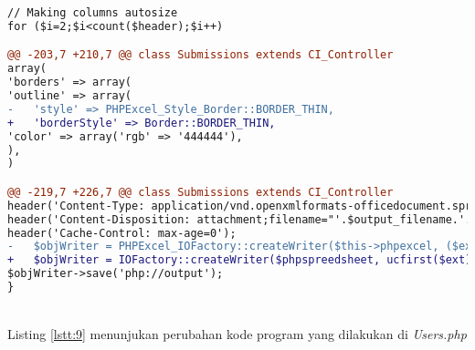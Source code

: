 \begin{lstlisting}[language=diff, caption=Perubahan kode program pada \textit{Submission.php}, label=lstt:8, basicstyle=\ttfamily, frame=single,
columns=fullflexible, keepspaces=true, breaklines=true]
// Making columns autosize
for ($i=2;$i<count($header);$i++)

@@ -203,7 +210,7 @@ class Submissions extends CI_Controller
array(
'borders' => array(
'outline' => array(
-   'style' => PHPExcel_Style_Border::BORDER_THIN,
+   'borderStyle' => Border::BORDER_THIN,
'color' => array('rgb' => '444444'),
),
)

@@ -219,7 +226,7 @@ class Submissions extends CI_Controller
header('Content-Type: application/vnd.openxmlformats-officedocument.spreadsheetml.sheet');
header('Content-Disposition: attachment;filename="'.$output_filename.'.'.$ext.'"');
header('Cache-Control: max-age=0');
-   $objWriter = PHPExcel_IOFactory::createWriter($this->phpexcel, ($ext==='xlsx'?'Excel2007':'Excel5'));
+   $objWriter = IOFactory::createWriter($phpspreedsheet, ucfirst($ext));
$objWriter->save('php://output');
}
\end{lstlisting}
~\\	
	Listing \ref{lstt:9} menunjukan perubahan kode program yang dilakukan di \textit{Users.php}
	
